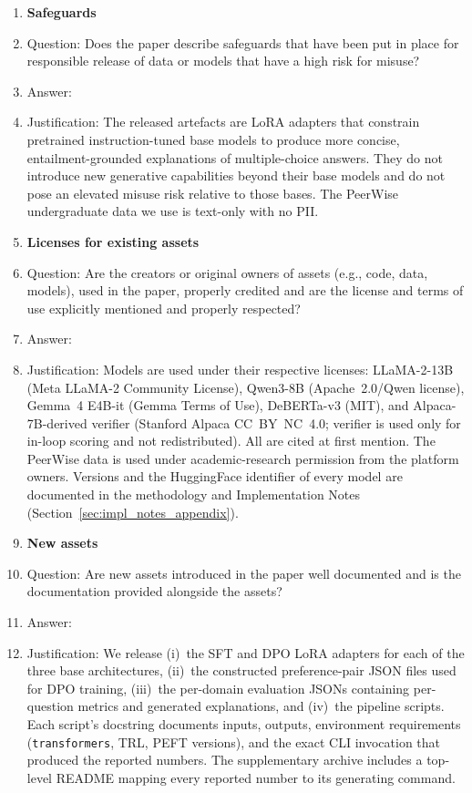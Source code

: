 \begin{enumerate}
\item {\bf Safeguards}
    \item[] Question: Does the paper describe safeguards that have been put in place for responsible release of data or models that have a high risk for misuse?
    \item[] Answer: \answerNA{}
    \item[] Justification: The released artefacts are LoRA adapters that constrain pretrained instruction-tuned base models to produce more concise, entailment-grounded explanations of multiple-choice answers. They do not introduce new generative capabilities beyond their base models and do not pose an elevated misuse risk relative to those bases. The PeerWise undergraduate data we use is text-only with no PII.

\item {\bf Licenses for existing assets}
    \item[] Question: Are the creators or original owners of assets (e.g., code, data, models), used in the paper, properly credited and are the license and terms of use explicitly mentioned and properly respected?
    \item[] Answer: \answerYes{}
    \item[] Justification: Models are used under their respective licenses: LLaMA-2-13B (Meta LLaMA-2 Community License), Qwen3-8B (Apache~2.0/Qwen license), Gemma~4 E4B-it (Gemma Terms of Use), DeBERTa-v3 (MIT), and Alpaca-7B-derived verifier (Stanford Alpaca CC~BY~NC~4.0; verifier is used only for in-loop scoring and not redistributed). All are cited at first mention. The PeerWise data is used under academic-research permission from the platform owners. Versions and the HuggingFace identifier of every model are documented in the methodology and Implementation Notes (Section~\ref{sec:impl_notes_appendix}).

\item {\bf New assets}
    \item[] Question: Are new assets introduced in the paper well documented and is the documentation provided alongside the assets?
    \item[] Answer: \answerYes{}
    \item[] Justification: We release (i)~the SFT and DPO LoRA adapters for each of the three base architectures, (ii)~the constructed preference-pair JSON files used for DPO training, (iii)~the per-domain evaluation JSONs containing per-question metrics and generated explanations, and (iv)~the pipeline scripts. Each script's docstring documents inputs, outputs, environment requirements (\texttt{transformers}, TRL, PEFT versions), and the exact CLI invocation that produced the reported numbers. The supplementary archive includes a top-level README mapping every reported number to its generating command.


\end{enumerate}
